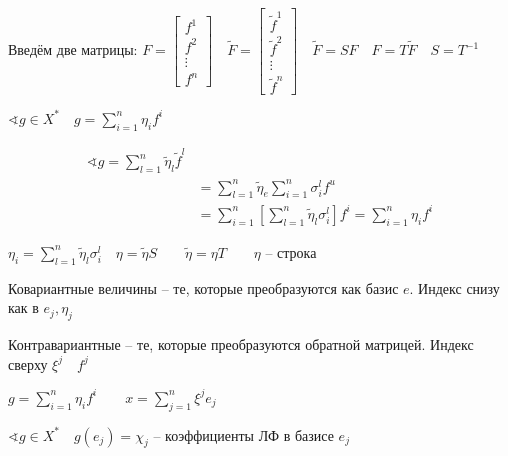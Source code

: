 \documentclass{book}
\newcommand{\tl}[1]{\widetilde{#1}}
\theoremstyle{definition}
\begin{document}
Введём две матрицы:  $F = \begin{bmatrix} f^1\\f^2\\ \vdots \\ f^n \end{bmatrix} \quad \tl F = \begin{bmatrix} \tl f^1 \\ \tl f^2 \\ \vdots\\ \tl f^n \end{bmatrix} \quad \tl F = SF\quad F = T\tl F\quad S = T^{-1}$

$\sphericalangle g\in X^*\quad g = \sum_{i=1}^{n} \eta_if^i$ 

\begin{align}
    \sphericalangle g = \sum_{l=1}^{n} \tl \eta_l\tl f^l \\&= \sum_{l=1}^{n} \tl \eta_e \sum_{i=1}^{n} \sigma_i^lf^u \\&= \sum_{i=1}^{n} \left[ \sum_{l=1}^{n} \tl \eta_l\sigma_i^l \right] f^i = \sum_{i=1}^{n} \eta_if^i
\end{align}

$\eta_i = \sum_{l=1}^{n} \tl \eta_l\sigma_i^l\quad  \eta = \tl \eta S\qquad \tl \eta = \eta T\qquad \eta$ -- строка

Ковариантные величины -- те, которые преобразуются как базис $e$. Индекс снизу как в $e_j, \eta_j$

Контравариантные -- те, которые преобразуются обратной матрицей. Индекс сверху $\xi^j\quad f^j$

$g = \sum\limits_{i=1}^n\eta_if^i\qquad x = \sum_{j=1}^{n} \xi^je_j$

$\sphericalangle g\in X^*\quad g\left( e_j \right)  = \chi_j $ -- коэффициенты ЛФ в базисе $e_j$
\end{document}
